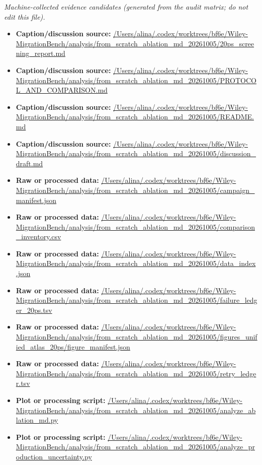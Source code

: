 \emph{Machine-collected evidence candidates (generated from the audit matrix; do not edit this file).}
\begin{itemize}[leftmargin=1.4em,noitemsep]
\item \textbf{Caption/discussion source:} \url{/Users/alina/.codex/worktrees/bf6e/Wiley-MigrationBench/analysis/from_scratch_ablation_md_20261005/20ps_screening_report.md}
\item \textbf{Caption/discussion source:} \url{/Users/alina/.codex/worktrees/bf6e/Wiley-MigrationBench/analysis/from_scratch_ablation_md_20261005/PROTOCOL_AND_COMPARISON.md}
\item \textbf{Caption/discussion source:} \url{/Users/alina/.codex/worktrees/bf6e/Wiley-MigrationBench/analysis/from_scratch_ablation_md_20261005/README.md}
\item \textbf{Caption/discussion source:} \url{/Users/alina/.codex/worktrees/bf6e/Wiley-MigrationBench/analysis/from_scratch_ablation_md_20261005/discussion_draft.md}
\item \textbf{Raw or processed data:} \url{/Users/alina/.codex/worktrees/bf6e/Wiley-MigrationBench/analysis/from_scratch_ablation_md_20261005/campaign_manifest.json}
\item \textbf{Raw or processed data:} \url{/Users/alina/.codex/worktrees/bf6e/Wiley-MigrationBench/analysis/from_scratch_ablation_md_20261005/comparison_inventory.csv}
\item \textbf{Raw or processed data:} \url{/Users/alina/.codex/worktrees/bf6e/Wiley-MigrationBench/analysis/from_scratch_ablation_md_20261005/data_index.json}
\item \textbf{Raw or processed data:} \url{/Users/alina/.codex/worktrees/bf6e/Wiley-MigrationBench/analysis/from_scratch_ablation_md_20261005/failure_ledger_20ps.tsv}
\item \textbf{Raw or processed data:} \url{/Users/alina/.codex/worktrees/bf6e/Wiley-MigrationBench/analysis/from_scratch_ablation_md_20261005/figures_unified_atlas_20ps/figure_manifest.json}
\item \textbf{Raw or processed data:} \url{/Users/alina/.codex/worktrees/bf6e/Wiley-MigrationBench/analysis/from_scratch_ablation_md_20261005/retry_ledger.tsv}
\item \textbf{Plot or processing script:} \url{/Users/alina/.codex/worktrees/bf6e/Wiley-MigrationBench/analysis/from_scratch_ablation_md_20261005/analyze_ablation_md.py}
\item \textbf{Plot or processing script:} \url{/Users/alina/.codex/worktrees/bf6e/Wiley-MigrationBench/analysis/from_scratch_ablation_md_20261005/analyze_production_uncertainty.py}

\end{itemize}
